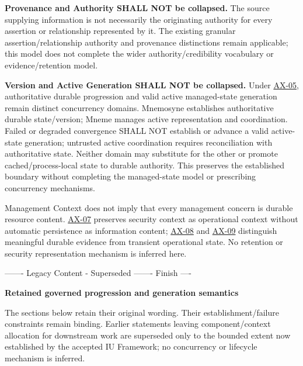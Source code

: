 \textbf{Provenance and Authority SHALL NOT be collapsed.} The source supplying
information is not necessarily the originating authority for every assertion or
relationship represented by it. The existing granular assertion/relationship
authority and provenance distinctions remain applicable; this model does not
complete the wider authority/credibility vocabulary or evidence/retention model.



\textbf{Version and Active Generation SHALL NOT be collapsed.} Under
\hyperref[element:0412a2084f0145babc4f022c71fea65f]{AX-05}, authoritative durable
progression and valid active managed-state generation remain distinct concurrency
domains. Mnemosyne establishes authoritative durable state/version; Mneme manages
active representation and coordination. Failed or degraded convergence SHALL NOT
establish or advance a valid active-state generation; untrusted active
coordination requires reconciliation with authoritative state. Neither domain
may substitute for the other or promote cached/process-local state to durable
authority. This preserves the established boundary without completing the
managed-state model or prescribing concurrency mechanisms.



Management Context does not imply that every management concern is durable
resource content. \hyperref[element:5de2ae2c3b794c2d9f3a14efd51d564f]{AX-07} preserves
security context as operational context without automatic persistence as
information content; \hyperref[element:21d6864657964ba5b03e3f6b5eb29cd5]{AX-08} and
\hyperref[element:9a5cb9e8876844e58e660f909f7df9fc]{AX-09} distinguish meaningful
durable evidence from transient operational state. No retention or security
representation mechanism is inferred here.



------- Legacy Content - Superseded ------- Finish ----



\par\medskip\textbf{Retained governed progression and generation semantics}\par


The sections below retain their original wording. Their establishment/failure
constraints remain binding. Earlier statements leaving component/context allocation
for downstream work are superseded only to the bounded extent now established by
the accepted IU Framework; no concurrency or lifecycle mechanism is inferred.



